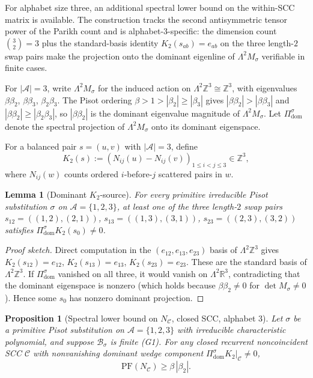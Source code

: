 \documentclass[11pt]{article}
\theoremstyle{plain}
\newtheorem{lemma}[theorem]{Lemma}
\newtheorem{proposition}[theorem]{Proposition}
\theoremstyle{definition}
\theoremstyle{remark}
\newcommand{\Z}{\mathbb{Z}}
\newcommand{\R}{\mathbb{R}}
\newcommand{\A}{\mathcal{A}}
\newcommand{\B}{\mathcal{B}}
\newcommand{\C}{\mathcal{C}}
\newcommand{\PFroot}{\mathrm{PF}}
\begin{document}
For alphabet size three, an additional spectral lower bound on the within-SCC matrix is available. The construction tracks the second antisymmetric tensor power of the Parikh count and is alphabet-$3$-specific: the dimension count $\binom{3}{2}=3$ plus the standard-basis identity $K_2(s_{ab})=e_{ab}$ on the three length-$2$ swap pairs make the projection onto the dominant eigenline of $\Lambda^2 M_\sigma$ verifiable in finite cases.

For $|\A|=3$, write $\Lambda^2 M_\sigma$ for the induced action on $\Lambda^2\Z^3\cong\Z^3$, with eigenvalues $\beta\beta_2$, $\beta\beta_3$, $\beta_2\beta_3$. The Pisot ordering $\beta>1>|\beta_2|\ge|\beta_3|$ gives $|\beta\beta_2|>|\beta\beta_3|$ and $|\beta\beta_2|\ge|\beta_2\beta_3|$, so $|\beta\beta_2|$ is the dominant eigenvalue magnitude of $\Lambda^2 M_\sigma$. Let $\Pi^\sigma_{\mathrm{dom}}$ denote the spectral projection of $\Lambda^2 M_\sigma$ onto its dominant eigenspace.

For a balanced pair $s=(u,v)$ with $|\A|=3$, define
\[
K_2(s):=(N_{ij}(u)-N_{ij}(v))_{1\le i<j\le 3}\in\Z^3,
\]
where $N_{ij}(w)$ counts ordered $i$-before-$j$ scattered pairs in $w$.

\begin{lemma}[Dominant $K_2$-source]\label{lem:dom-K2}
For every primitive irreducible Pisot substitution $\sigma$ on $\A=\{1,2,3\}$, at least one of the three length-$2$ swap pairs $s_{12}=((1,2),(2,1))$, $s_{13}=((1,3),(3,1))$, $s_{23}=((2,3),(3,2))$ satisfies $\Pi^\sigma_{\mathrm{dom}}K_2(s_0)\ne 0$.
\end{lemma}

\begin{proof}[Proof sketch]
Direct computation in the $(e_{12},e_{13},e_{23})$ basis of $\Lambda^2\Z^3$ gives $K_2(s_{12})=e_{12}$, $K_2(s_{13})=e_{13}$, $K_2(s_{23})=e_{23}$. These are the standard basis of $\Lambda^2\Z^3$. If $\Pi^\sigma_{\mathrm{dom}}$ vanished on all three, it would vanish on $\Lambda^2\R^3$, contradicting that the dominant eigenspace is nonzero (which holds because $\beta\beta_2\ne 0$ for $\det M_\sigma\ne 0$). Hence some $s_0$ has nonzero dominant projection.
\end{proof}

\begin{proposition}[Spectral lower bound on $N_\C$, closed SCC, alphabet 3]\label{thm:v34}
Let $\sigma$ be a primitive Pisot substitution on $\A=\{1,2,3\}$ with irreducible characteristic polynomial, and suppose $\B_\sigma$ is finite \textup{(G1)}. For any \emph{closed} recurrent noncoincident SCC $\C$ with nonvanishing dominant wedge component $\Pi^\sigma_{\mathrm{dom}}K_2|_\C\ne 0$,
\[
\PFroot(N_\C)\ge\beta\,|\beta_2|.
\]
\end{proposition}
\end{document}
